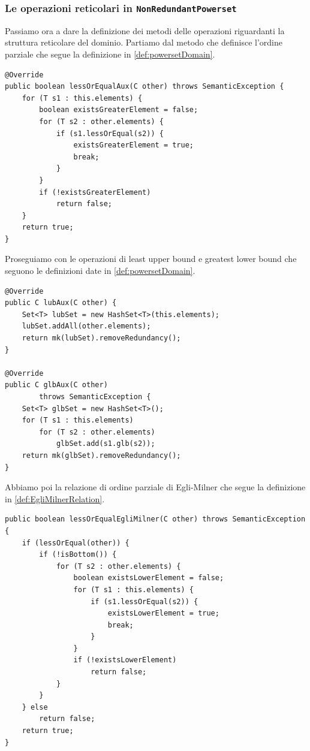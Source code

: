 \subsubsection{Le operazioni reticolari in \texttt{NonRedundantPowerset}}
Passiamo ora a dare la definizione dei metodi delle operazioni riguardanti la struttura reticolare del dominio. Partiamo dal metodo che definisce l'ordine parziale che segue la definizione in \ref{def:powersetDomain}.
\begin{lstlisting}[belowskip=-1.1 \baselineskip]
@Override
public boolean lessOrEqualAux(C other) throws SemanticException {
    for (T s1 : this.elements) {
        boolean existsGreaterElement = false;
        for (T s2 : other.elements) {
            if (s1.lessOrEqual(s2)) {
                existsGreaterElement = true;
                break;
            }
        }
        if (!existsGreaterElement)
            return false;
    }
    return true;
}
\end{lstlisting}
Proseguiamo con le operazioni di least upper bound e greatest lower bound che seguono le definizioni date in \ref{def:powersetDomain}.
\begin{lstlisting}[belowskip=-1.1 \baselineskip]
@Override
public C lubAux(C other) {
    Set<T> lubSet = new HashSet<T>(this.elements);
    lubSet.addAll(other.elements);
    return mk(lubSet).removeRedundancy();
}

@Override
public C glbAux(C other)
        throws SemanticException {
    Set<T> glbSet = new HashSet<T>();
    for (T s1 : this.elements)
        for (T s2 : other.elements)
            glbSet.add(s1.glb(s2));
    return mk(glbSet).removeRedundancy();
}
\end{lstlisting}
Abbiamo poi la relazione di ordine parziale di Egli-Milner che segue la definizione in \ref{def:EgliMilnerRelation}.
\begin{lstlisting}[belowskip=-1.1 \baselineskip]
public boolean lessOrEqualEgliMilner(C other) throws SemanticException {
    if (lessOrEqual(other)) {
        if (!isBottom()) {
            for (T s2 : other.elements) {
                boolean existsLowerElement = false;
                for (T s1 : this.elements) {
                    if (s1.lessOrEqual(s2)) {
                        existsLowerElement = true;
                        break;
                    }
                }
                if (!existsLowerElement)
                    return false;
            }
        }
    } else
        return false;
    return true;
}
\end{lstlisting}
